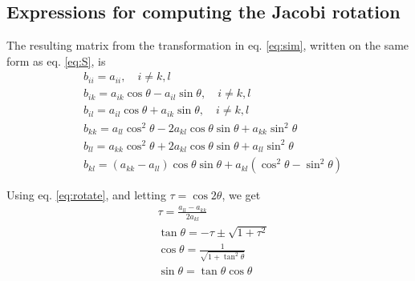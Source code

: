 \subsection*{Expressions for computing the Jacobi rotation}
 The resulting matrix from the transformation in eq. \ref{eq:sim}, written on the same form as eq. \ref{eq:S}, is 
 \begin{equation}\label{eq:rotate}
 \begin{split}
 &b_{ii} = a_{ii}, \quad i\neq k,l  \\
 &b_{ik} = a_{ik}\cos{\theta} - a_{il}\sin \theta, \quad i\neq k,l \\
 &b_{il} = a_{il}\cos{\theta} + a_{ik}\sin \theta, \quad i\neq k,l \\
 &b_{kk} = a_{ll}\cos^2{\theta} - 2a_{kl}\cos{\theta}\sin{\theta} + a_{kk}\sin^2{\theta}  \\
 &b_{ll} = a_{kk}\cos^2{\theta} + 2a_{kl}\cos{\theta}\sin{\theta} + a_{ll}\sin^2{\theta}  \\
 &b_{kl} = \left( a_{kk} - a_{ll}\right) \cos{\theta}\sin{\theta} + a_{kl}\left( \cos^2\theta - \sin^2\theta\right) 
 \end{split}
 \end{equation}
 
 Using eq. \ref{eq:rotate}, and letting $\tau = \cos{2\theta}$, we get
 \begin{equation}
 \begin{split}
 &\tau =  \frac{a_{ll}-a_{kk}}{2a_{kl}} \\
 &\tan \theta = -\tau \pm \sqrt{1+\tau^2} \\
 &\cos \theta = \frac{1}{\sqrt{1+\tan^2 \theta}} \\
 &\sin \theta = \tan \theta \cos \theta 
 \end{split}
 \end{equation}
